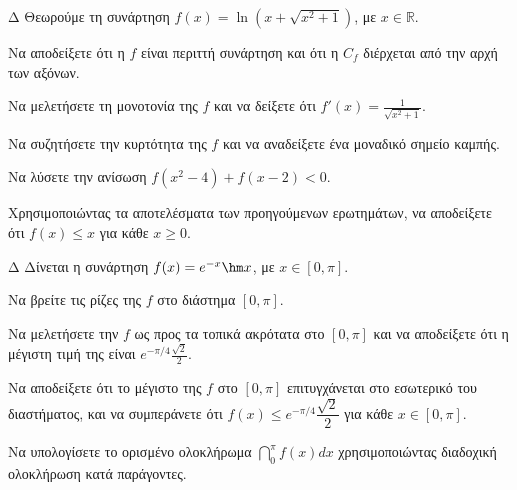 \begin{thema}{Δ}
Θεωρούμε τη συνάρτηση $f(x) = \ln\left( x + \sqrt{x^2+1} \right)$, με $x \in \mathbb{R}$.
\begin{erwthma}
    \item Να αποδείξετε ότι η $f$ είναι περιττή συνάρτηση και ότι η $C_f$ διέρχεται από την αρχή των αξόνων.
    \item Να μελετήσετε τη μονοτονία της $f$ και να δείξετε ότι $f'(x) = \frac{1}{\sqrt{x^2+1}}$. 
    \item Να συζητήσετε την κυρτότητα της $f$ και να αναδείξετε ένα μοναδικό σημείο καμπής.
    \item Να λύσετε την ανίσωση $f(x^2 - 4) + f(x - 2) < 0$.
    \item Χρησιμοποιώντας τα αποτελέσματα των προηγούμενων ερωτημάτων, να αποδείξετε ότι $f(x) \leq x$ για κάθε $x \geq 0$.
\end{erwthma}
\end{thema}

\begin{thema}{Δ}
Δίνεται η συνάρτηση $f(x) = e^{-x} \hm x$, με $x \in [0, \pi]$.
\begin{erwthma}
    \item Να βρείτε τις ρίζες της $f$ στο διάστημα $[0, \pi]$.
    \item Να μελετήσετε την $f$ ως προς τα τοπικά ακρότατα στο $[0, \pi]$ και να αποδείξετε ότι η μέγιστη τιμή της είναι $e^{-\pi/4} \frac{\sqrt{2}}{2}$.
    \item Να αποδείξετε ότι το μέγιστο της $f$ στο $[0, \pi]$ επιτυγχάνεται στο εσωτερικό του διαστήματος, και να συμπεράνετε ότι $f(x) \leq e^{-\pi/4}\dfrac{\sqrt{2}}{2}$ για κάθε $x \in [0, \pi]$.
    \item Να υπολογίσετε το ορισμένο ολοκλήρωμα $\dint_0^\pi f(x) dx$ χρησιμοποιώντας διαδοχική ολοκλήρωση κατά παράγοντες.
\end{erwthma}
\end{thema}

